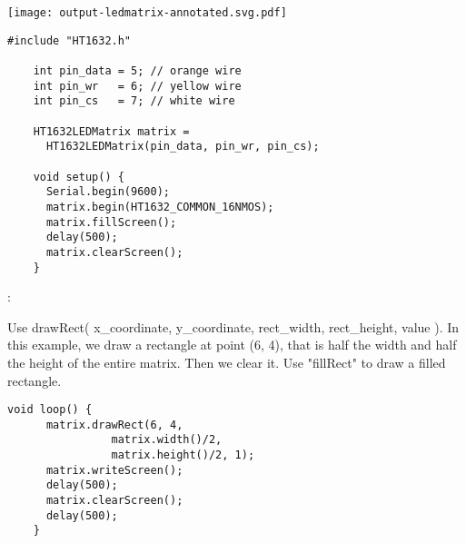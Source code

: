 \vspace{0.1in}
\begin{minipage}[t]{0.49\tw}
  \vspace{0.0in}
  \texttt{[image: output-ledmatrix-annotated.svg.pdf]}

\end{minipage}
\hspace{0.1in}
\begin{minipage}[t]{0.49\tw}
  \vspace{0.0in}
  \begin{Verbatim}[gobble=3,fontsize=\small]
    #include "HT1632.h"

    int pin_data = 5; // orange wire
    int pin_wr   = 6; // yellow wire
    int pin_cs   = 7; // white wire

    HT1632LEDMatrix matrix =
      HT1632LEDMatrix(pin_data, pin_wr, pin_cs);

    void setup() {
      Serial.begin(9600);
      matrix.begin(HT1632_COMMON_16NMOS);
      matrix.fillScreen();
      delay(500);
      matrix.clearScreen();
    }
  \end{Verbatim}

  :
  \vspace{0.1in}

  Use drawRect( x\_coordinate, y\_coordinate, rect\_width, rect\_height,
  value ). In this example, we draw a rectangle at point (6, 4), that
  is half the width and half the height of the entire matrix. Then we
  clear it. Use "fillRect" to draw a filled rectangle.

  \begin{Verbatim}[gobble=3,fontsize=\small]
    void loop() {
      matrix.drawRect(6, 4,
                matrix.width()/2,
                matrix.height()/2, 1);
      matrix.writeScreen();
      delay(500);
      matrix.clearScreen();
      delay(500);
    }

  \end{Verbatim}

\end{minipage}
\newpage
